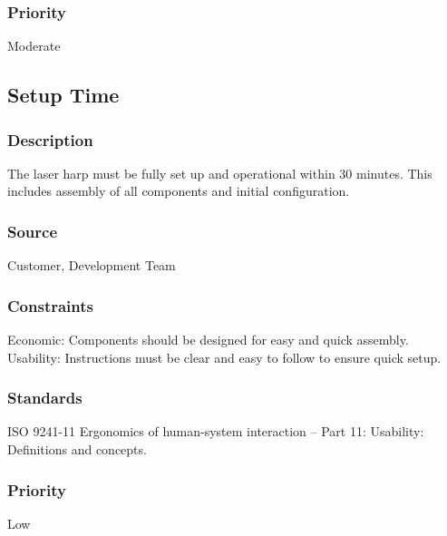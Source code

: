 \subsubsection{Priority}
Moderate


\subsection{Setup Time}
\subsubsection{Description}
The laser harp must be fully set up and operational within 30 minutes. This includes assembly of all components and initial configuration.
\subsubsection{Source}
Customer, Development Team
\subsubsection{Constraints}
Economic: Components should be designed for easy and quick assembly.
Usability: Instructions must be clear and easy to follow to ensure quick setup.
\subsubsection{Standards}
ISO 9241-11 Ergonomics of human-system interaction – Part 11: Usability: Definitions and concepts.
\subsubsection{Priority}
Low
